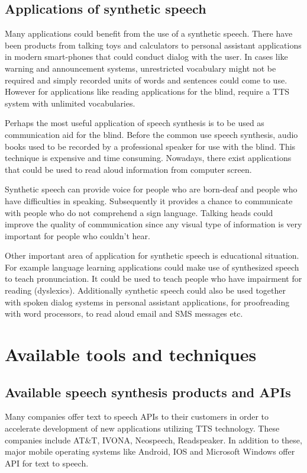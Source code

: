 \documentclass[11pt,a4paper,oneside,article]{memoir}
\begin{document}
\section{Applications of synthetic speech}
Many applications could benefit from the use of a synthetic speech. There have been products from talking toys and calculators to personal assistant applications in modern smart-phones that could conduct dialog with the user. In cases like warning and announcement systems, unrestricted vocabulary might not be required and simply recorded units of words and sentences could come to use. However for applications like reading applications for the blind, require a TTS system with unlimited vocabularies.\cite{hut}

Perhaps the most useful application of speech synthesis is to be used as communication aid for the blind. Before the common use speech synthesis, audio books used to be recorded by a professional speaker for use with the blind. This technique is expensive and time consuming. Nowadays, there exist applications that could be used to read aloud information from computer screen.

Synthetic speech can provide voice for people who are born-deaf and people who have difficulties in speaking. Subsequently it provides a chance to communicate with people who do not comprehend a sign language. Talking heads could improve the quality of communication since any visual type of information is very important for people who couldn't hear.

Other important area of application for synthetic speech is educational situation. For example language learning applications could make use of synthesized speech to teach pronunciation. It could be used to teach people who have impairment for reading (dyslexics).\cite{hut} Additionally synthetic speech could also be used together with spoken dialog systems in personal assistant applications, for proofreading with word processors, to read aloud email and SMS messages etc.



\clearpage
\chapter{Available tools and techniques}

\section{Available speech synthesis products and APIs}
Many companies offer text to speech APIs to their customers in order to accelerate development of new applications utilizing TTS technology. These companies include AT\&T, IVONA, Neospeech, Readspeaker. In addition to these, major mobile operating systems like Android, IOS and Microsoft Windows offer API for text to speech. 
\end{document}
